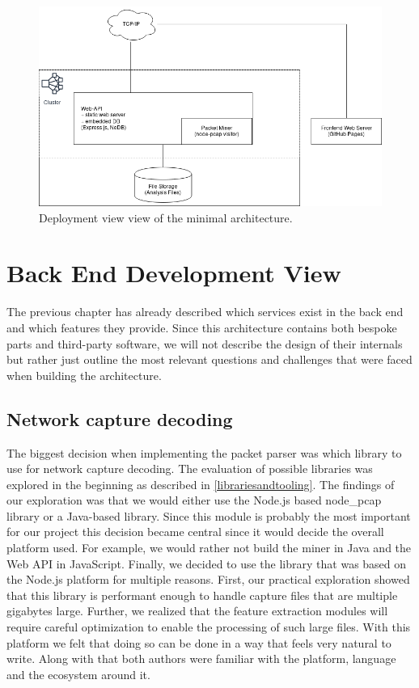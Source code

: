 \begin{figure}
    \centering
    \includegraphics[width=16cm]{images/deploymentviewmvp.png}
    \caption{Deployment view view of the minimal architecture.}
    \label{fig:deploymentviewmvp}
\end{figure}

\section{Back End Development View}
The previous chapter has already described which services exist in the back end and which features they provide. Since this architecture contains both bespoke parts and third-party software, we will not describe the design of their internals but rather just outline the most relevant questions and challenges that were faced when building the architecture.

\subsection{Network capture decoding}\label{networkcapturedecoding}
The biggest decision when implementing the packet parser was which library to use for network capture decoding. The evaluation of possible libraries was explored in the beginning as described in \ref{librariesandtooling}. The findings of our exploration was that we would either use the Node.js based node\_pcap library or a Java-based library. Since this module is probably the most important for our project this decision became central since it would decide the overall platform used. For example, we would rather not build the miner in Java and the Web API in JavaScript.
Finally, we decided to use the library that was based on the Node.js platform for multiple reasons. First, our practical exploration showed that this library is performant enough to handle capture files that are multiple gigabytes large. Further, we realized that the feature extraction modules will require careful optimization to enable the processing of such large files. With this platform we felt that doing so can be done in a way that feels very natural to write. Along with that both authors were familiar with the platform, language and the ecosystem around it.

